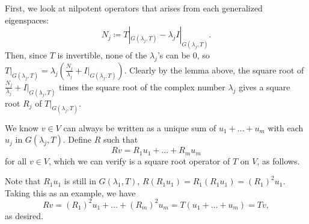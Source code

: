 \documentclass[11pt]{article}
\begin{document}
\begin{itemize}
    First, we look at nilpotent operators that arises from each generalized eigenspaces: \[N_j \coloneqq T|_{G(\lambda_j,T)} - \lambda_j I|_{G(\lambda_j,T)}.\] Then, since $T$ is invertible, none of the $\lambda_j$'s can be 0, so $T|_{G(\lambda_j,T)} = \lambda_j (
    \frac{N_j}{\lambda_j} + I|_{G(\lambda_j,T)})$. Clearly by the lemma above, the square root of $\frac{N_j}{\lambda_j} + I|_{G(\lambda_j,T)}$ times the square root of the complex number $\lambda_j$ gives a square root $R_j$ of $T|_{G(\lambda_j,T)}$.

    We know $v \in V$ can always be written as a unique sum of $u_1 + \dots + u_m$ with each $u_j$ in $G(\lambda_j,T)$. Define $R$ such that \[Rv = R_1u_1 + \dots + R_m u_m\] for all $v \in V$, which we can verify is a square root operator of $T$ on $V$, as follows.

    Note that $R_1u_1$ is still in $G(\lambda_1,T)$, $R(R_1u_1) = R_1(R_1u_1) = (R_1)^2u_1$. Taking this as an example, we have \[Rv = (R_1)^2 u_1 + \dots + (R_m)^2 u_m = T(u_1 + \dots +u_m) = Tv,\] as desired.
\end{itemize}
\end{document}
